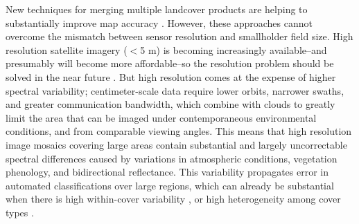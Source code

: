 \documentclass[preprint,12pt,authoryear]{elsarticle}
\begin{document}
New techniques for merging multiple landcover products are helping to substantially improve map accuracy \citep{fritz_cropland_2011,fritz_mapping_2015}. However, these approaches cannot overcome the mismatch between sensor resolution and smallholder field size. High resolution satellite imagery ($<$5 m) is becoming increasingly available--and presumably will become more affordable--so the resolution problem should be solved in the near future \citep{see_improved_2015, lobell_use_2013}. But high resolution comes at the expense of higher spectral variability; centimeter-scale data require lower orbits, narrower swaths, and greater communication bandwidth, which combine with clouds to greatly limit the area that can be imaged under contemporaneous environmental conditions, and from comparable viewing angles. This means that high resolution image mosaics covering large areas contain substantial and largely uncorrectable spectral differences caused by variations in atmospheric conditions, vegetation phenology, and bidirectional reflectance. This variability propagates error in automated classifications over large regions, which can already be substantial when there is high within-cover variability \citep{debats_generalized_2015}, or high heterogeneity among cover types \citep{gross_monitoring_2013}.  

\end{document}
